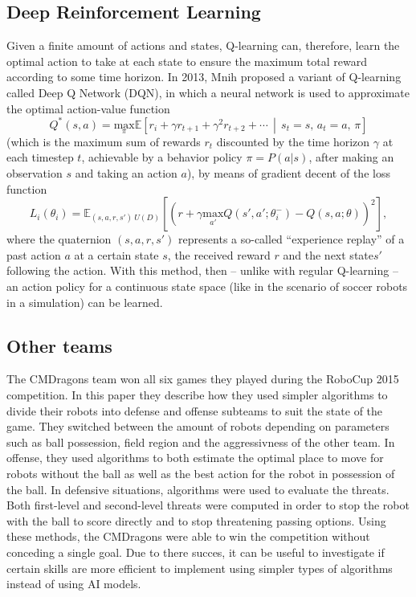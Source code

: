 \subsection{Deep Reinforcement Learning}
Given a finite amount of actions and states, Q-learning can, therefore, learn the optimal action to take at each state to ensure the maximum total reward according to some time horizon. In 2013, Mnih\cite{DQN} proposed a variant of Q-learning called Deep Q Network (DQN), in which a neural network is used to approximate the optimal action-value function
\[
    Q^*(s,a)=\underset \pi {\text{max}} \mathbb{E}\left[ r_i+\gamma r_{t+1}+\gamma^2 r_{t+2}+\cdots \,\middle|\, s_t=s,\,a_t=a,\,\pi \right]
\]
(which is the maximum sum of rewards \(r_t\) discounted by the time horizon \(\gamma\) at each timestep \(t\), achievable by a behavior policy \(\pi=P(a|s)\), after making an observation \(s\) and taking an action \(a\)), by means of gradient decent of the loss function
\[
L_i(\theta_i)=\mathbb{E}_{(s,a,r,s')~U(D)}\left[\left(r+ \gamma \underset {a'} {\text{max}} Q(s',a';\theta^-_i)-Q(s,a;\theta)\right)^2\right]
,\]
where the quaternion \((s,a,r,s')\) represents a so-called ``experience replay'' of a past action \(a\) at a certain state \(s\), the received reward \(r\) and the next state\(s'\) following the action. With this method, then -- unlike with regular Q-learning -- an action policy for a continuous state space (like in the scenario of soccer robots in a simulation) can be learned.

\subsection{Other teams}
The CMDragons team won all six games they played during the RoboCup 2015 competition. In this paper they 
describe how they used simpler algorithms to divide their robots into defense and offense subteams to suit the state 
of the game. They switched between the amount of robots depending on parameters such as ball possession, 
field region and the aggressivness of the other team. In offense, they used algorithms to both estimate the 
optimal place to move for robots without the ball as well as the best action for the robot in possession of the 
ball. In defensive situations, algorithms were used to evaluate the threats. Both first-level and second-level 
threats were computed in order to stop the robot with the ball to score directly and to stop threatening passing 
options. Using these methods, the CMDragons were able to win the competition without conceding a single goal\cite{CMDragons2015}.
Due to there succes, it can be useful to investigate if certain skills are more efficient to implement using simpler
types of algorithms instead of using AI models. 
